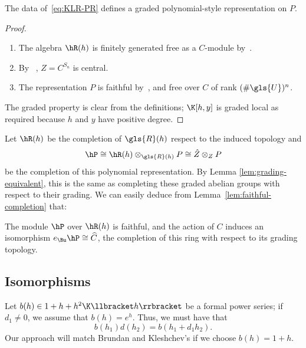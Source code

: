 \begin{lemma}
 The data of~\eqref{eq:KLR-PR} defines a graded polynomial-style
 representation on $P$. 
\end{lemma}
\begin{proof}\mbox{}
 \begin{enumerate}
 \item The algebra $\hR(h)$ is finitely generated free as a
$C$-module by~\cite[Cor.~2.10]{KLI}. 
 \item By
~\cite[Thm.~2.9]{KLI}, $Z=C^{S_n} $ is central.
 \item The representation $P$ is faithful by~\cite[Cor.~2.6]{KLI},
 and free over $C$ of rank $(\# \gls{U})^n$. 
 \end{enumerate}
 The graded property is clear from the definitions; $\K[h,y]$ is
 graded local as required because $h$ and $y$ have positive degree.
 \end{proof}
Let $\hR(h)$ be the completion of $\gls{R}(h)$
respect to the induced topology and \[\hP\cong
\hR(h)\otimes_{\gls{R}(h)}P\cong \hat{Z}\otimes_{Z} P\]
be the completion of this polynomial representation. By Lemma
\ref{lem:grading-equivalent}, this is the same as completing these
graded abelian groups with respect to their grading. We can easily
deduce from Lemma~\ref{lem:faithful-completion} that:
\begin{lemma}\label{lem:KLR-P}
The module $\hP$ over $\hR(h)$ is faithful, and the action of $C$ induces an isomorphism $e_{\Bu}\hP\cong \widehat{C}$, the completion of
this ring with respect to its grading topology. 
\end{lemma}

\subsection{Isomorphisms}
Let $b(h)\in 1+h+h^2\K\llbracket h\rrbracket $ be a formal power series; if $d_1\neq 0$, we
assume that $b(h)=e^h$. Thus, we must have that
\begin{equation}
b(h_1)d(h_2)=b(h_1+d_1h_2). \label{eq:b-d}
\end{equation}
Our approach will match Brundan and Kleshchev's if we choose
$b(h)=1+h$. 

